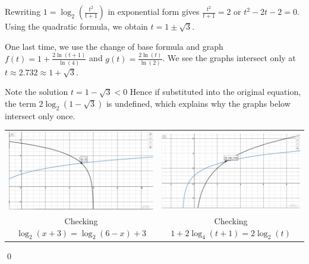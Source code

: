 \documentclass{ximera}
\begin{document}
\begin{ex}
\begin{enumerate}
Rewriting $1 = \log_{2}\left( \frac{t^{2}}{t+1}\right)$ in exponential form gives  $ \frac{t^{2}}{t+1} = 2$ or $t^2 -2t-2 = 0$.  Using the quadratic formula, we obtain  $t = 1 \pm \sqrt{3}$.

One last time, we use the change of base formula and graph  $f(t) = 1 + \frac{2\ln(t+1)}{\ln(4)}$ and $g(t) = \frac{2 \ln(t)}{\ln(2)}$.   We see the graphs intersect only at $t \approx 2.732 \approx 1 + \sqrt{3}$.  

\smallskip

Note the solution $t = 1 - \sqrt{3} < 0$ Hence if substituted into the original equation, the term $2 \log_{2}\left(1 - \sqrt{3}\right)$ is undefined, which explains why the graphs below intersect only once.

\begin{center}

\begin{tabular}{cc}

\includegraphics[width=3in]{./LogarithmicEquationsandInequalitiesGraphics/LogEqnEx05.jpg} &

\includegraphics[width=3in]{./LogarithmicEquationsandInequalitiesGraphics/LogEqnEx06.jpg}  \\

Checking $\log_{2}(x+3) = \log_{2}(6-x)+3$
 
 &
 
 Checking $1 + 2 \log_{4}(t+1) = 2 \log_{2}(t)$
 
\end{tabular}

\end{center}
\end{enumerate}

\qed
\end{ex}
\end{document}
